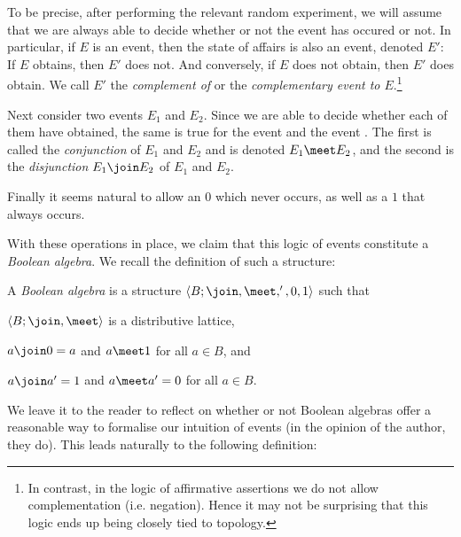 \documentclass[article, a4paper, 11pt, oneside]{memoir}
\numberwithin{equation}{chapter}
\begin{document}
To be precise, after performing the relevant random experiment, we will assume that we are always able to decide whether or not the event has occured or not. In particular, if $E$ is an event, then the state of affairs  is also an event, denoted $E'$: If $E$ obtains, then $E'$ does not. And conversely, if $E$ does not obtain, then $E'$ does obtain. We call $E'$ the \emph{complement of} or the \emph{complementary event to $E$}.\footnote{In contrast, in the logic of affirmative assertions we do not allow complementation (i.e. negation). Hence it may not be surprising that this logic ends up being closely tied to topology.}

Next consider two events $E_1$ and $E_2$. Since we are able to decide whether each of them have obtained, the same is true for the event  and the event . The first is called the \emph{conjunction} of $E_1$ and $E_2$ and is denoted $E_1 \meet E_2$, and the second is the \emph{disjunction} $E_1 \join E_2$ of $E_1$ and $E_2$.

Finally it seems natural to allow an  $0$ which never occurs, as well as a  $1$ that always occurs.

With these operations in place, we claim that this logic of events constitute a \emph{Boolean algebra}. We recall the definition of such a structure:

\begin{definition}
    A \emph{Boolean algebra} is a structure $\langle B; \join, \meet, ', 0, 1 \rangle$ such that
    \begin{enumdef}
        \item $\langle B; \join, \meet \rangle$ is a distributive lattice,
        \item $a \join 0 = a$ and $a \meet 1$ for all $a \in B$, and
        \item $a \join a' = 1$ and $a \meet a' = 0$ for all $a \in B$.
    \end{enumdef}
\end{definition}
%
We leave it to the reader to reflect on whether or not Boolean algebras offer a reasonable way to formalise our intuition of events (in the opinion of the author, they do). This leads naturally to the following definition:
\end{document}
